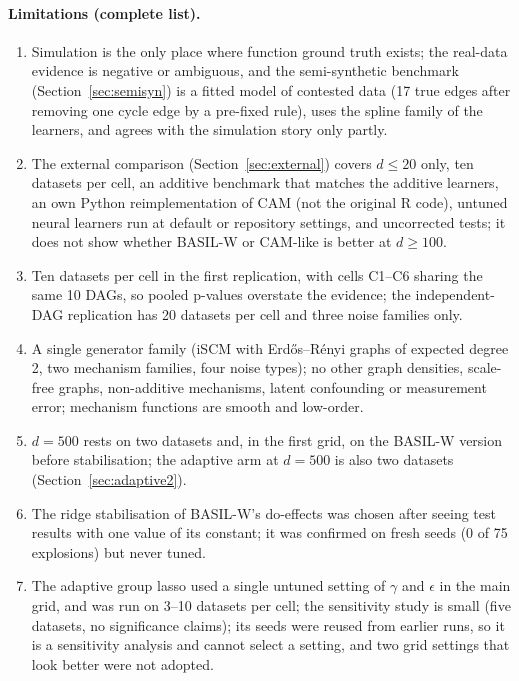 \documentclass[11pt,a4paper]{article}
\begin{document}
\paragraph{Limitations (complete list).}
\begin{enumerate}[leftmargin=*,itemsep=2pt]
  \item Simulation is the only place where function ground truth exists; the real-data evidence is negative or ambiguous, and the semi-synthetic benchmark (Section~\ref{sec:semisyn}) is a fitted model of contested data (17 true edges after removing one cycle edge by a pre-fixed rule), uses the spline family of the learners, and agrees with the simulation story only partly.
  \item The external comparison (Section~\ref{sec:external}) covers $d\le20$ only, ten datasets per cell, an additive benchmark that matches the additive learners, an own Python reimplementation of CAM (not the original R code), untuned neural learners run at default or repository settings, and uncorrected tests; it does not show whether BASIL-W or CAM-like is better at $d\ge100$.
  \item Ten datasets per cell in the first replication, with cells C1--C6 sharing the same 10 DAGs, so pooled p-values overstate the evidence; the independent-DAG replication has 20 datasets per cell and three noise families only.
  \item A single generator family (iSCM with Erd\H{o}s--R\'enyi graphs of expected degree 2, two mechanism families, four noise types); no other graph densities, scale-free graphs, non-additive mechanisms, latent confounding or measurement error; mechanism functions are smooth and low-order.
  \item $d=500$ rests on two datasets and, in the first grid, on the BASIL-W version before stabilisation; the adaptive arm at $d=500$ is also two datasets (Section~\ref{sec:adaptive2}).
  \item The ridge stabilisation of BASIL-W's do-effects was chosen after seeing test results with one value of its constant; it was confirmed on fresh seeds (0 of 75 explosions) but never tuned.
  \item The adaptive group lasso used a single untuned setting of $\gamma$ and $\epsilon$ in the main grid, and was run on 3--10 datasets per cell; the sensitivity study is small (five datasets, no significance claims); its seeds were reused from earlier runs, so it is a sensitivity analysis and cannot select a setting, and two grid settings that look better were not adopted.

\end{enumerate}
\end{document}
